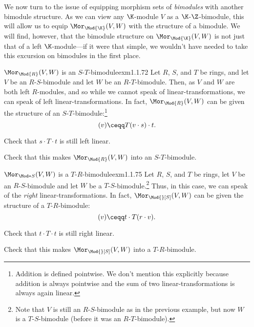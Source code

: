 We now turn to the issue of equipping morphism sets of \emph{bimodules} with another bimodule structure.  As we can view any $\K$-module $V$ as a $\K$-$\Z$-bimodule, this will allow us to equip $\Mor _{\Mod{\K}}(V,W)$ with the structure of a bimodule.  We will find, however, that the bimodule structure on $\Mor _{\Mod{\K}}(V,W)$ is not just that of a left $\K$-module---if it were that simple, we wouldn't have needed to take this excursion on bimodules in the first place.
\begin{exm}{$\Mor _{\Mod{R}}(V,W)$ is an $S$-$T$-bimodule}{exm1.1.72}
	Let $R$, $S$, and $T$ be rings, and let $V$ be an $R$-$S$-bimodule and let $W$ be an $R$-$T$-bimodule.  Then, as $V$ and $W$ are both left $R$-modules, and so while we cannot speak of linear-transformations, we can speak of left linear-transformations.  In fact, $\Mor _{\Mod{R}}(V,W)$ can be given the structure of an $S$-$T$-bimodule:\footnote{Addition is defined pointwise.  We don't mention this explicitly because addition is always pointwise and the sum of two linear-transformations is always again linear.}
	\begin{equation}
		[s\cdot T\cdot t](v)\ceqq T(v\cdot s)\cdot t.
	\end{equation}
	\begin{exr}[breakable=false]{}{}
		Check that $s\cdot T\cdot t$ is still left linear.
	\end{exr}
	\begin{exr}[breakable=false]{}{}
		Check that this makes $\Mor _{\Mod{R}}(V,W)$ into an $S$-$T$-bimodule.
	\end{exr}
\end{exm}
\begin{exm}{$\Mor _{\Mod*{S}}(V,W)$ is a $T$-$R$-bimodule}{exm1.1.75}
	Let $R$, $S$, and $T$ be rings, let $V$ be an $R$-$S$-bimodule and let $W$ be a $T$-$S$-bimodule.\footnote{Note that $V$ is still an $R$-$S$-bimodule as in the previous example, but now $W$ is a $T$-$S$-bimodule (before it was an $R$-$T$-bimodule).}  Thus, in this case, we can speak of the \emph{right} linear-transformations.  In fact, $\Mor _{\Mod{}[S]}(V,W)$ can be given the structure of a $T$-$R$-bimodule:
	\begin{equation}
		[t\cdot T\cdot r](v)\ceqq t\cdot T(r\cdot v).
	\end{equation}
	\begin{exr}[breakable=false]{}{}
		Check that $t\cdot T\cdot t$ is still right linear.
	\end{exr}
	\begin{exr}[breakable=false]{}{}
		Check that this makes $\Mor _{\Mod{}[S]}(V,W)$ into a $T$-$R$-bimodule.
	\end{exr}
\end{exm}
